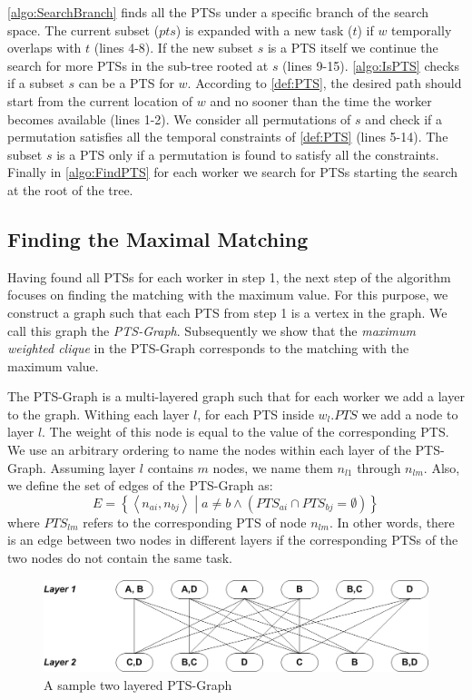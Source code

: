 \cref{algo:SearchBranch} finds all the PTSs under a specific branch of the search space. The current subset ($pts$) is expanded with a new task ($t$) if $w$ temporally overlaps with $t$ (lines 4-8). If the new subset $s$ is a PTS itself we continue the search for more PTSs in the sub-tree rooted at $s$ (lines  9-15). \cref{algo:IsPTS} checks if a subset $s$ can be a PTS for $w$. According to \cref{def:PTS}, the desired path should start from the current location of $w$ and no sooner than the time the worker becomes available (lines  1-2). We consider all permutations of $s$ and check if a permutation satisfies all the temporal constraints of \cref{def:PTS} (lines 5-14). The subset $s$ is a PTS only if a permutation is found to satisfy all the constraints. Finally in \cref{algo:FindPTS} for each worker we search for PTSs starting the search at the root of the tree.
			
\subsection{Finding the Maximal Matching}
\label{subsec:FindMM}
Having found all PTSs for each worker in step 1, the next step of the algorithm focuses on finding the matching with the maximum value. For this purpose, we construct a graph such that each PTS from step 1 is a vertex in the graph. We call this graph the \emph{PTS-Graph}. Subsequently we show that the \emph{maximum weighted clique} in the PTS-Graph corresponds to the matching with the maximum value.

The PTS-Graph is a multi-layered graph such that for each worker we add a layer to the graph. Withing each layer $l$, for each PTS inside $w_l.PTS$ we add a node to layer $l$. The weight of this node is equal to the value of the corresponding PTS. We use an arbitrary ordering to name the nodes within each layer of the PTS-Graph. Assuming layer $l$ contains $m$ nodes, we name them $n_{l1}$ through $n_{lm}$. Also, we define the set of edges of the PTS-Graph as:
\begin{equation*}
E = \left\{ \left\langle n_{ai}, n_{bj} \right\rangle \middle | a \neq b \land \left(PTS_{ai} \cap PTS_{bj} = \emptyset \right) \right\}
\end{equation*}
where $PTS_{lm}$ refers to the corresponding PTS of node $n_{lm}$. In other words, there is an edge between two nodes in different layers if the corresponding PTSs of the two nodes do not contain the same task.

\begin{figure}[t]
	\centering
	\includegraphics[width = 0.85\columnwidth]{figures/PTS_graph.png}
			\vspace{-0.2cm}
	\caption{A sample two layered PTS-Graph}
	\label{fig:PTS_tree}
			\vspace{-0.2cm}
\end{figure}

